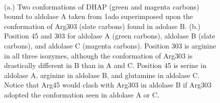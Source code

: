 \documentclass[11pt,a4paper]{article}
\begin{document}
\begin{figure}
        \begin{center}
                \mbox
                {
                        \quad
                }
                \caption{(a.) Two conformations of DHAP (green and magenta carbons) bound to aldolase A taken from 1ado superimposed
			upon the conformation of Arg303 (slate carbons) found in adolase B.  (b.)  Position 45 and 303 for aldolase A 
			(green carbons), aldolase B (slate carbons), and aldolase C (magenta carbons).  Position 303 is arginine in all 
			three isozymes, although the conformation of Arg303 is drastically different in B than in A and C.  Position
			45 is serine in aldolase A, arginine in aldolase B, and glutamine in aldolase C.  Notice that Arg45 would clash
			with Arg303 in aldolase B if Arg303 adopted the conformation seen in aldolase A or C.}
                \label{B_comparison}
        \end{center}
\end{figure}
\end{document}

